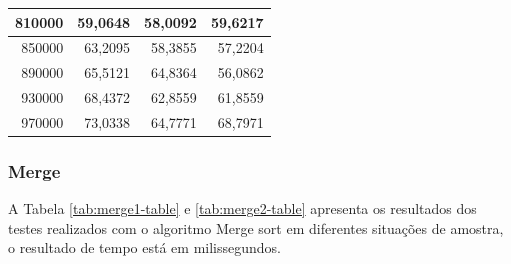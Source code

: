 \documentclass[a4paper, 12pt]{article}
\begin{document}
\begin{longtable}[c]{@{}rrrr@{}}
			\multicolumn{1}{|r|}{810000}                  & \multicolumn{1}{r|}{59,0648}                & \multicolumn{1}{r|}{58,0092}                & \multicolumn{1}{r|}{59,6217}                \\* \midrule
			\multicolumn{1}{|r|}{850000}                  & \multicolumn{1}{r|}{63,2095}                & \multicolumn{1}{r|}{58,3855}                & \multicolumn{1}{r|}{57,2204}                \\* \midrule
			\multicolumn{1}{|r|}{890000}                  & \multicolumn{1}{r|}{65,5121}                & \multicolumn{1}{r|}{64,8364}                & \multicolumn{1}{r|}{56,0862}                \\* \midrule
			\multicolumn{1}{|r|}{930000}                  & \multicolumn{1}{r|}{68,4372}                & \multicolumn{1}{r|}{62,8559}                & \multicolumn{1}{r|}{61,8559}                \\* \midrule
			\multicolumn{1}{|r|}{970000}                  & \multicolumn{1}{r|}{73,0338}                & \multicolumn{1}{r|}{64,7771}                & \multicolumn{1}{r|}{68,7971}                \\* \bottomrule
		\end{longtable}

\subsubsection{Merge}
	A Tabela \ref{tab:merge1-table} e \ref{tab:merge2-table}  apresenta os resultados dos testes realizados com o algoritmo Merge sort em diferentes situações de amostra, o resultado de tempo está em milissegundos.
\end{document}
